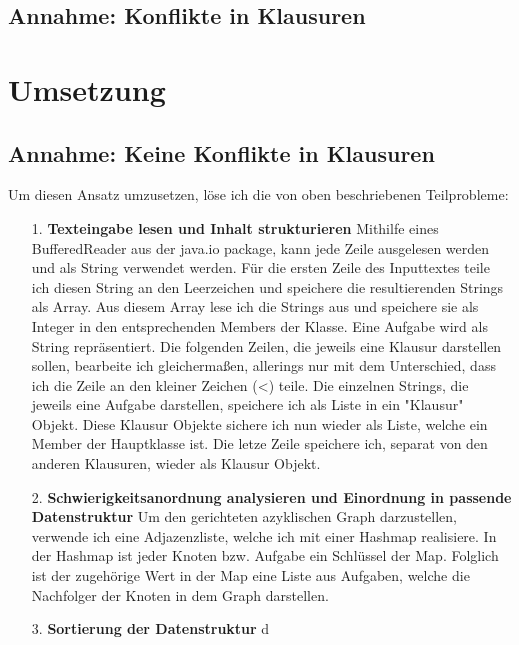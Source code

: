 \documentclass[a4paper,10pt,ngerman]{scrartcl}
\begin{document}
\subsection{Annahme: Konflikte in Klausuren}

\section{Umsetzung}
\subsection{Annahme: Keine Konflikte in Klausuren}
Um diesen Ansatz umzusetzen, löse ich die von oben beschriebenen Teilprobleme:
\begin{itemize}
  \item[1.] \textbf{Texteingabe lesen und Inhalt strukturieren}
  \newline
  Mithilfe eines BufferedReader aus der java.io package, kann jede Zeile ausgelesen werden und als String verwendet werden. Für die ersten Zeile des Inputtextes
  teile ich diesen String an den Leerzeichen und speichere die resultierenden Strings als Array. Aus diesem Array lese ich die Strings aus und speichere sie als Integer in
  den entsprechenden Members der Klasse. Eine Aufgabe wird als String repräsentiert.
  \newline
  Die folgenden Zeilen, die jeweils eine Klausur darstellen sollen, bearbeite ich gleichermaßen, allerings nur mit dem Unterschied, dass ich die Zeile an den kleiner Zeichen (<) teile.
  Die einzelnen Strings, die jeweils eine Aufgabe darstellen, speichere ich als Liste in ein "Klausur" Objekt. Diese Klausur Objekte sichere ich nun wieder als Liste, welche ein Member der Hauptklasse ist.
  \newline
  Die letze Zeile speichere ich, separat von den anderen Klausuren, wieder als Klausur Objekt.
  \item[2.] \textbf{Schwierigkeitsanordnung analysieren und Einordnung in passende Datenstruktur}
  \newline
  Um den gerichteten azyklischen Graph darzustellen, verwende ich eine Adjazenzliste, welche ich mit einer Hashmap realisiere. In der Hashmap ist jeder Knoten bzw. Aufgabe ein Schlüssel der Map.
  Folglich ist der zugehörige Wert in der Map eine Liste aus Aufgaben, welche die Nachfolger der Knoten in dem Graph darstellen.
  \item[3.] \textbf{Sortierung der Datenstruktur}
  \newline
  d

\end{itemize}
\end{document}
